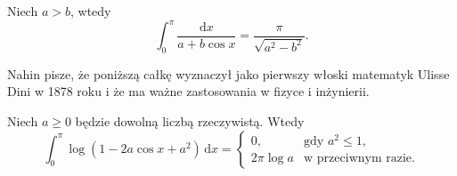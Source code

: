 \begin{problem}
    Niech $a > b$, wtedy
    \begin{equation}
        \int_0^\pi \frac{\mathrm{d}x} {a + b \cos x} = \frac{\pi}{\sqrt{a^2 - b^2}}.
    \end{equation}
\end{problem}

Nahin \cite[s. 109-112]{nahin15} pisze, że poniższą całkę wyznaczył jako pierwszy włoski matematyk Ulisse Dini w 1878 roku i że ma ważne zastosowania w fizyce i inżynierii.
%

\begin{problem}
    Niech $a \ge 0$ będzie dowolną liczbą rzeczywistą.
    Wtedy
    \begin{equation}
        \int_0^\pi \log (1 - 2 a \cos x + a^2) \,\mathrm{d} x = \begin{cases}
            0, & \text{gdy } a^2 \le 1, \\
            2 \pi \log a & \textrm{w przeciwnym razie}.
        \end{cases}
    \end{equation}
\end{problem}

%